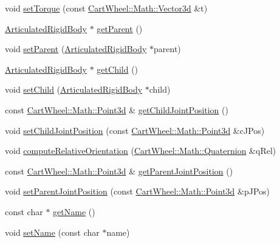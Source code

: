 \begin{DoxyCompactItemize}
\item 
void \hyperlink{classCartWheel_1_1Physics_1_1Joint_a2fb769c24ce509160bccb2358aa459f6}{setTorque} (const \hyperlink{classCartWheel_1_1Math_1_1Vector3d}{CartWheel::Math::Vector3d} \&t)
\item 
\hyperlink{classCartWheel_1_1Physics_1_1ArticulatedRigidBody}{ArticulatedRigidBody} $\ast$ \hyperlink{classCartWheel_1_1Physics_1_1Joint_acea937f59d890c8609b24b05e48324e8}{getParent} ()
\item 
void \hyperlink{classCartWheel_1_1Physics_1_1Joint_a9aeff3d11d8b0938a916b380860f5f75}{setParent} (\hyperlink{classCartWheel_1_1Physics_1_1ArticulatedRigidBody}{ArticulatedRigidBody} $\ast$parent)
\item 
\hyperlink{classCartWheel_1_1Physics_1_1ArticulatedRigidBody}{ArticulatedRigidBody} $\ast$ \hyperlink{classCartWheel_1_1Physics_1_1Joint_a82537e73fcfdc27403a65f2936bf11a9}{getChild} ()
\item 
void \hyperlink{classCartWheel_1_1Physics_1_1Joint_a5b08a6c1d549bdb45362d630a79d2e79}{setChild} (\hyperlink{classCartWheel_1_1Physics_1_1ArticulatedRigidBody}{ArticulatedRigidBody} $\ast$child)
\item 
const \hyperlink{classCartWheel_1_1Math_1_1Point3d}{CartWheel::Math::Point3d} \& \hyperlink{classCartWheel_1_1Physics_1_1Joint_a3ffb2ecc8fe1d297ccc6a7e61482ab11}{getChildJointPosition} ()
\item 
void \hyperlink{classCartWheel_1_1Physics_1_1Joint_a094d17f2e7d2f8ce267c873556828979}{setChildJointPosition} (const \hyperlink{classCartWheel_1_1Math_1_1Point3d}{CartWheel::Math::Point3d} \&cJPos)
\item 
void \hyperlink{classCartWheel_1_1Physics_1_1Joint_a345db35db31fb2bbd73e5608792390ad}{computeRelativeOrientation} (\hyperlink{classCartWheel_1_1Math_1_1Quaternion}{CartWheel::Math::Quaternion} \&qRel)
\item 
const \hyperlink{classCartWheel_1_1Math_1_1Point3d}{CartWheel::Math::Point3d} \& \hyperlink{classCartWheel_1_1Physics_1_1Joint_ac0365213bd8aab8af0db718c87e63fd9}{getParentJointPosition} ()
\item 
void \hyperlink{classCartWheel_1_1Physics_1_1Joint_a3444214c6968a6823ba8de8f4a6082c0}{setParentJointPosition} (const \hyperlink{classCartWheel_1_1Math_1_1Point3d}{CartWheel::Math::Point3d} \&pJPos)
\item 
const char $\ast$ \hyperlink{classCartWheel_1_1Physics_1_1Joint_a69b2e2a04082adbcd2163a4856435eb6}{getName} ()
\item 
void \hyperlink{classCartWheel_1_1Physics_1_1Joint_a9548588237bafc0ee3ef24e03edfe1cd}{setName} (const char $\ast$name)
\end{DoxyCompactItemize}
